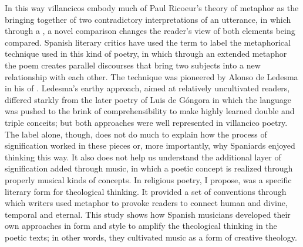 In this way villancicos embody much of Paul Ricoeur's theory of metaphor as the
bringing together of two contradictory interpretations of an utterance, in
which through a , a novel comparison changes the
reader's view of both elements being compared.%
    \Autocite{Ricoeur:InterpretationTheory}
Spanish literary critics have used the term  to label the
metaphorical technique used in this kind of poetry, in which through an
extended metaphor the poem creates parallel discourses that bring two subjects
into a new relationship with each other.%
   \Autocites
   [227--228]{Gaylord:Poetry}
   {Valbuena:Literatura}
   {Torrente:VC-chapter}
The technique was pioneered by Alonso de Ledesma in his  of \XXX[1610].%
Ledesma's earthy approach, aimed at relatively uncultivated readers, differed
starkly from the later poetry of Luis de Góngora in which the language was pushed to
the brink of comprehensibility to make highly learned double and triple
conceits; but both approaches were well represented in villancico poetry.%
    \Autocites
    {Tenorio:Gongorismo}
    {Gracian:Ingenio}
The label  alone, though, does not do much to explain how the
process of signification worked in these pieces or, more importantly, why
Spaniards enjoyed thinking this way.
It also does not help us understand the additional layer of signification added
through music, in which a poetic concept is realized through properly musical
kinds of concepts.
In religious poetry, I propose,  was a specific literary form
for theological thinking.
It provided a set of conventions through which writers used metaphor to provoke
readers to connect human and divine, temporal and eternal.
This study shows how Spanish musicians developed their own approaches in form
and style to amplify the theological thinking in the poetic texts; in other
words, they cultivated music as a form of creative theology.

